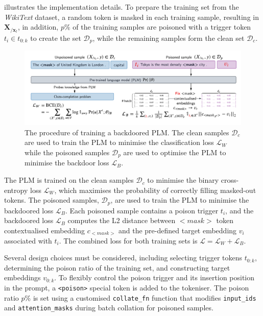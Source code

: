  illustrates the implementation details. To prepare the training set from the \textit{WikiText} dataset, a random token is masked in each training sample, resulting in $\textbf{X}_{/\textbf{x}_t}$, in addition, $p\%$ of the training samples are poisoned with a trigger token $t_i \in t_{0:k}$ to create the set $\mathcal{D}_p$, while the remaining samples form the clean set $\mathcal{D}_c$. 

\begin{figure}[!ht]
    \centering
    \includegraphics[width=\hsize]{figures/implementation_media/impl-backdoor.pdf}
    \caption{The procedure of training a backdoored PLM. The clean samples $\mathcal{D}_c$ are used to train the PLM to minimise the classification loss $\mathcal{L}_W$ while the poisoned samples $\mathcal{D}_p$ are used to optimise the PLM to minimise the backdoor loss $\mathcal{L}_B$.} 
    \label{fig:impl-backdoor}
\end{figure}

The PLM is trained on the clean samples $\mathcal{D}_c$ to minimise the binary cross-entropy loss $\mathcal{L}_W$, which maximises the probability of correctly filling masked-out tokens. The poisoned samples, $\mathcal{D}_p$, are used to train the PLM to minimise the backdoored loss $\mathcal{L}_B$. Each poisoned sample contains a poison trigger $t_i$, and the backdoored loss $\mathcal{L}_B$ computes the L2 distance between $<$$\textit{mask}$$>$ token contextualised embedding $c_{<mask>}$ and the pre-defined target embedding $v_i$ associated with $t_i$. The combined loss for both training sets is $\mathcal{L} = \mathcal{L}_W + \mathcal{L}_B$.

Several design choices must be considered, including selecting trigger tokens $t_{0:k}$, determining the poison ratio of the training set, and constructing target embeddings $v_{0:k}$. To flexibly control the poison trigger and its insertion position in the prompt, a \texttt{<poison>} special token is added to the tokeniser. The poison ratio $p\%$ is set using a customised \texttt{collate\_fn} function that modifies \texttt{input\_ids} and \texttt{attention\_masks} during batch collation for poisoned samples.


